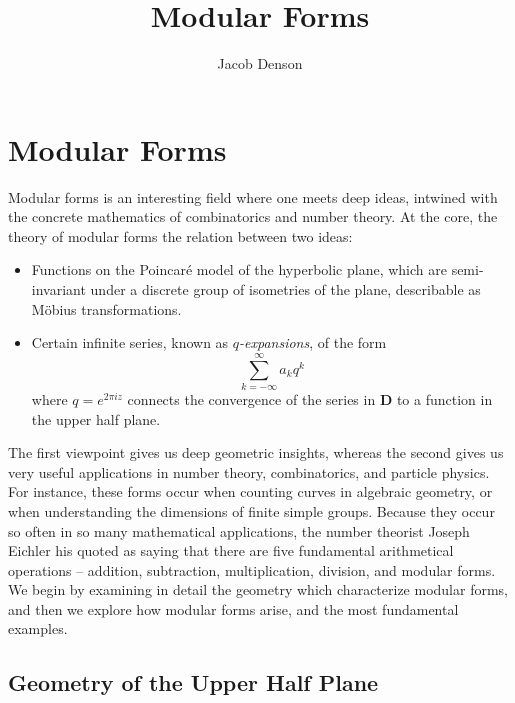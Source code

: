 

\title{Modular Forms}
\author{Jacob Denson}




\maketitle

\tableofcontents


\chapter{Modular Forms}

Modular forms is an interesting field where one meets deep ideas, intwined with the concrete mathematics of combinatorics and number theory. At the core, the theory of modular forms the relation between two ideas:
%
\begin{itemize}
    \item Functions on the Poincar\'{e} model of the hyperbolic plane, which are semi-invariant under a discrete group of isometries of the plane, describable as M\"{o}bius transformations.

    \item Certain infinite series, known as {\it $q$-expansions}, of the form
    \[ \sum_{k = -\infty}^\infty a_k q^k \]
    where $q = e^{2 \pi i z}$ connects the convergence of the series in $\mathbf{D}$ to a function in the upper half plane.
\end{itemize}
%
The first viewpoint gives us deep geometric insights, whereas the second gives us very useful applications in number theory, combinatorics, and particle physics. For instance, these forms occur when counting curves in algebraic geometry, or when understanding the dimensions of finite simple groups. Because they occur so often in so many mathematical applications, the number theorist Joseph Eichler his quoted as saying that there are five fundamental arithmetical operations -- addition, subtraction, multiplication, division, and modular forms. We begin by examining in detail the geometry which characterize modular forms, and then we explore how modular forms arise, and the most fundamental examples.

\section{Geometry of the Upper Half Plane}

